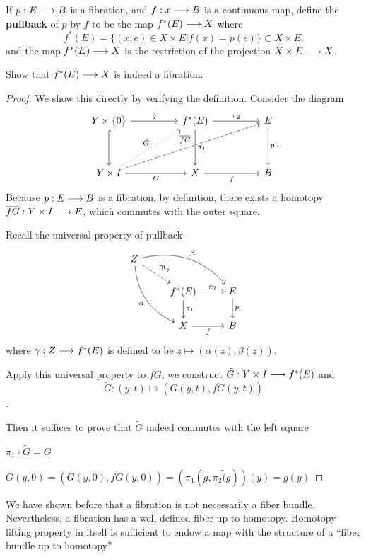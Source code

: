 \documentclass[11pt]{book} %
\begin{document}
\begin{definition}
If $p: E\longrightarrow B$ is a fibration, and $f: x\longrightarrow B$ is a continuous map, define the \textbf{pullback} of $p$ by $f$ to be the map $f^{*}(E)\longrightarrow X$ where
$$
f^*(E)=\{(x,e)\in X\times E|f(x)=p(e)\}\subset X\times E.
$$
and the map $f^*(E)\longrightarrow X$ is the restriction of the projection $X\times E\longrightarrow X$.
\end{definition}
\begin{exr}\label{exr:pullback_of_fibration}
Show that $f^*(E)\longrightarrow X$ is indeed a fibration.
\end{exr}
\begin{proof}
We show this directly by verifying the definition. Consider the diagram
$$
\begin{tikzcd}
Y\times \{0\} \arrow[dd, hook] \arrow[rr, "\tilde{g}"] &  & f^{*}(E) \arrow[rr, "\pi_2"] \arrow[dd, "\pi_1"] &  & E \arrow[dd, "p"] \\
 &  &  &  &  \\
Y\times I \arrow[rr, "G"'] \arrow[rrrruu, "\overline{fG}", dashed] \arrow[rruu, "\tilde{G}", dotted] &  & X \arrow[rr, "f"'] &  & B
\end{tikzcd}.
$$
Because $p: E\longrightarrow B$ is a fibration, by definition, there exists a homotopy $\overline{fG}: Y\times I\longrightarrow E$, which commutes with the outer square.

Recall the universal property of pullback
$$
\begin{tikzcd}
Z \arrow[rdd, "\alpha"', bend right] \arrow[rrd, "\beta", bend left] \arrow[rd, "\exists !\gamma", dashed] &  &  \\
 & f^{*}(E) \arrow[r, "\pi_2"] \arrow[d, "\pi_1"] & E \arrow[d, "p"] \\
 & X \arrow[r, "f"'] & B
\end{tikzcd}
$$
where $\gamma: Z\longrightarrow f^*(E)$ is defined to be 
$z\mapsto (\alpha(z), \beta(z))$. 

Apply this universal property to $\overline{f G}$, we construct $\tilde{G}: Y\times I\longrightarrow f^*(E)$ and
$$
\tilde{G}: (y,t)\mapsto (G(y,t),\overline{fG}(y,t))
$$.

Then it suffices to prove that $\tilde{G}$ indeed commutes with the left square

$\pi_1\circ \tilde{G}=G$\checkmark 

$\tilde{G}(y,0)=(G(y,0),\overline{fG}(y,0))=(\pi_1(\tilde{g},\pi_2\tilde(g))(y)=\tilde{g}(y)$\checkmark
\end{proof}


We have shown before that a fibration is not necessarily a fiber bundle. Nevertheless, a fibration has a well defined fiber up to homotopy. Homotopy lifting property in itself is sufficient to endow a map with the structure of a ``fiber bundle up to homotopy''.
\end{document}
